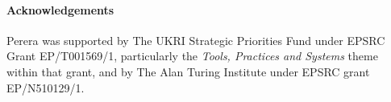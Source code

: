 \makeatletter%
\if@ACM@anonymous%
\else%
\paragraph{Acknowledgements}

Perera was supported by The UKRI Strategic Priorities Fund under EPSRC Grant EP/T001569/1, particularly the \emph{Tools, Practices and Systems} theme within that grant, and by The Alan Turing Institute under EPSRC grant EP/N510129/1.
\fi%
\makeatother%
